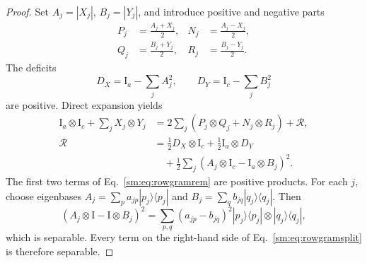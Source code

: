 \documentclass[aps,prl,reprint,superscriptaddress,nofootinbib]{revtex4-2}
\newcommand{\I}{\mathrm{I}}
\begin{document}
\begin{proof}
Set \(A_j=|X_j|\), \(B_j=|Y_j|\), and introduce positive and
negative parts
\begin{align}
 P_j&=\frac{A_j+X_j}{2},&N_j&=\frac{A_j-X_j}{2},
\nonumber\\
 Q_j&=\frac{B_j+Y_j}{2},&R_j&=\frac{B_j-Y_j}{2}.
\label{sm:eq:positiveparts}
\end{align}
The deficits
\begin{equation}
 D_X=\I_a-\sum_jA_j^2,
 \qquad D_Y=\I_c-\sum_jB_j^2
\label{sm:eq:deficits}
\end{equation}
are positive.  Direct expansion yields
\begin{align}
 \I_a\otimes\I_c+\sum_jX_j\otimes Y_j
 &=2\sum_j(P_j\otimes Q_j+N_j\otimes R_j)+\mathcal R,
\label{sm:eq:rowgramsplit}\\
 \mathcal R
 &=\frac12D_X\otimes\I_c+\frac12\I_a\otimes D_Y
\nonumber\\[-1mm]
 &\quad+\frac12\sum_j
 (A_j\otimes\I_c-\I_a\otimes B_j)^2.
\label{sm:eq:rowgramrem}
\end{align}
The first two terms of Eq.~\eqref{sm:eq:rowgramrem} are positive products.
For each \(j\), choose eigenbases
\(A_j=\sum_p a_{jp}|p_j\rangle\langle p_j|\) and
\(B_j=\sum_q b_{jq}|q_j\rangle\langle q_j|\).  Then
\begin{equation}
 (A_j\otimes\I-\I\otimes B_j)^2
 =\sum_{p,q}(a_{jp}-b_{jq})^2
 |p_j\rangle\langle p_j|\otimes|q_j\rangle\langle q_j|,
\label{sm:eq:diagsquare}
\end{equation}
which is separable.  Every term on the right-hand side of
Eq.~\eqref{sm:eq:rowgramsplit} is therefore separable.
\end{proof}
\end{document}
